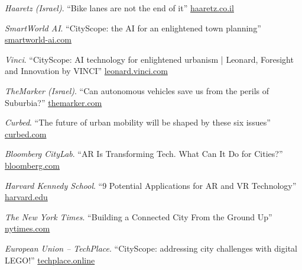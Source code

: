 \begin{tablist}
    \item[2021] \tab \textit{Haaretz (Israel)}. \enquote{Bike lanes are not the end of it}
    \href{https://www.haaretz.co.il/magazine/.premium.HIGHLIGHT-MAGAZINE-1.10002361}{haaretz.co.il}

    \item[2019] \tab \textit{SmartWorld AI}. \enquote{CityScope: the AI for an enlightened town planning}
    \href{https://smartworld-ai.com/cityscope-the-ai-for-an-enlightened-town-planning/}{smartworld-ai.com}

    \item[2019] \tab \textit{Vinci}. \enquote{CityScope: AI technology for enlightened urbanism | Leonard, Foresight and Innovation by VINCI}
    \href{https://leonard.vinci.com/en/cityscope-ai-technology-for-enlightened-urbanism/}{leonard.vinci.com}

    \item[2019] \tab \textit{TheMarker (Israel)}. \enquote{Can autonomous vehicles save us from the perils of Suburbia?}
    \href{https://www.themarker.com/magazine/.premium-MAGAZINE-1.6985623}{themarker.com}

    \item[2018] \tab \textit{Curbed}. \enquote{The future of urban mobility will be shaped by these six issues}
    \href{https://www.curbed.com/2018/12/18/18144513/future-mobility-autonomous-vehicles-cooper-hewitt}{curbed.com}

    \item[2018] \tab \textit{Bloomberg CityLab}. \enquote{AR Is Transforming Tech. What Can It Do for Cities?}
    \href{https://www.bloomberg.com/news/articles/2018-08-03/how-ar-can-transform-the-way-cities-work}{bloomberg.com}

    \item[2018] \tab \textit{Harvard Kennedy School}. \enquote{9 Potential Applications for AR and VR Technology}
    \href{https://datasmart.ash.harvard.edu/news/article/9-potential-applications-ar-and-vr-technology}{harvard.edu}

    \item[2018] \tab \textit{The New York Times}. \enquote{Building a Connected City From the Ground Up}
    \href{https://www.nytimes.com/2018/04/03/business/smart-city.html}{nytimes.com}

    \item[2018] \tab \textit{European Union -- TechPlace}. \enquote{CityScope: addressing city challenges with digital LEGO!}
    \href{https://www.techplace.online/cityscope-addressing-city-challenges-with-digital-lego/}{techplace.online}


\end{tablist}
